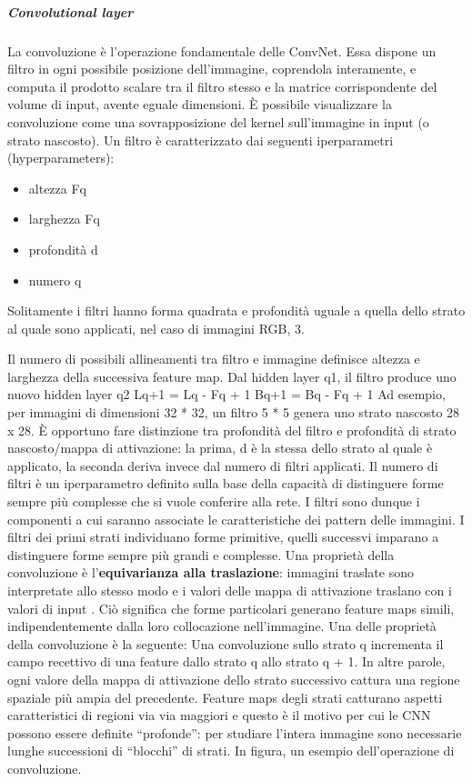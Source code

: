 \documentclass[14pt]{extarticle}
\begin{document}
\begin{itemize}
\subparagraph{Convolutional layer}
La convoluzione è l’operazione fondamentale delle ConvNet. Essa dispone un filtro in ogni possibile posizione dell’immagine, coprendola interamente, e computa il prodotto scalare tra il filtro stesso e la matrice corrispondente del volume di input, avente
eguale dimensioni. È possibile visualizzare la convoluzione come una sovrapposizione del kernel sull’immagine in input (o strato nascosto). \cite{aggarwal2018neural} 
Un filtro è caratterizzato dai
seguenti iperparametri (hyperparameters):
\begin{itemize}
\item altezza Fq
\item larghezza Fq
\item profondità d
\item numero q
\end{itemize}
Solitamente i filtri hanno forma quadrata e profondità uguale a quella dello strato al
quale sono applicati, nel caso di immagini RGB, 3.  Il numero di possibili
allineamenti tra filtro e immagine definisce altezza e larghezza della successiva feature
map.
Dal hidden layer q1, il filtro produce uno nuovo hidden layer q2
Lq+1 = Lq - Fq + 1
Bq+1 = Bq - Fq + 1
Ad esempio, per immagini di dimensioni 32 * 32, un filtro 5 * 5 genera uno strato
nascosto 28 x 28.
È opportuno fare distinzione tra profondità del filtro e profondità di strato nascosto/mappa di attivazione: la prima, d è la stessa dello strato al quale è applicato, la
seconda deriva invece dal numero di filtri applicati. Il numero di filtri è un iperparametro definito sulla base della capacità di distinguere forme sempre più complesse che
si vuole conferire alla rete. I filtri sono dunque i componenti a cui saranno associate le
caratteristiche dei pattern delle immagini.
I filtri dei primi strati individuano forme primitive, quelli successvi imparano a distinguere forme sempre più grandi e complesse. Una proprietà della convoluzione è
l’\textbf{equivarianza alla traslazione}: immagini traslate sono interpretate allo stesso modo e
i valori delle mappa di attivazione traslano con i valori di input \cite{torresin2019sviluppo}. Ciò significa che forme particolari generano feature maps simili, indipendentemente dalla loro collocazione
nell’immagine.
Una delle proprietà della convoluzione è la seguente:
	 Una convoluzione sullo strato
q incrementa il campo recettivo di una feature dallo strato q allo strato q + 1. In altre parole, ogni valore della mappa di attivazione dello strato successivo cattura una regione
spaziale più ampia del precedente. Feature maps degli strati catturano aspetti caratteristici di regioni via via maggiori e questo è il motivo per cui le CNN possono essere
definite “profonde”: per studiare l’intera immagine sono necessarie lunghe successioni
di “blocchi” di strati. 
In figura, un esempio dell’operazione di convoluzione.


\end{itemize}
\end{document}
